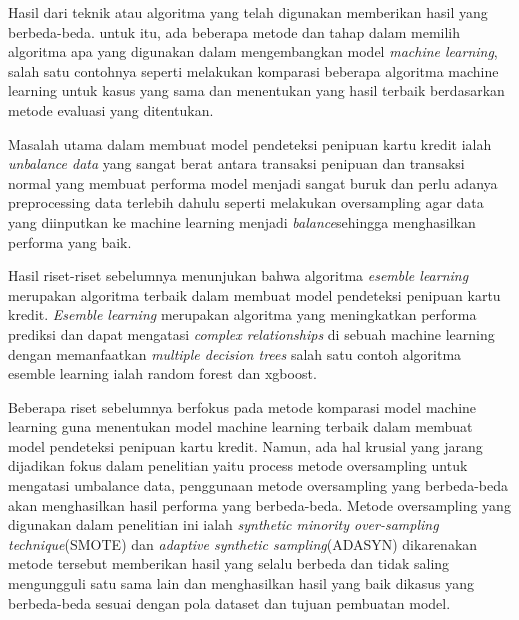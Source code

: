 Hasil dari teknik atau algoritma yang telah digunakan memberikan hasil yang berbeda-beda. untuk itu, ada beberapa metode dan tahap dalam memilih algoritma apa yang digunakan dalam mengembangkan model \textit{machine learning}, salah satu contohnya seperti melakukan komparasi beberapa algoritma machine learning untuk kasus yang sama dan menentukan yang hasil terbaik berdasarkan metode evaluasi yang ditentukan\cite{mniai2023novel}.

Masalah utama dalam membuat model pendeteksi penipuan kartu kredit ialah \textit{unbalance data} yang sangat berat antara transaksi penipuan dan transaksi normal yang membuat performa model menjadi sangat buruk dan perlu adanya preprocessing data terlebih dahulu seperti melakukan oversampling agar data yang diinputkan ke machine learning menjadi \textit{balance}sehingga menghasilkan performa yang baik\cite{mniai2023novel}.

Hasil riset-riset sebelumnya menunjukan bahwa algoritma \textit{esemble learning} merupakan algoritma terbaik dalam membuat model pendeteksi penipuan kartu kredit\cite{ningsih2022analisis}. \textit{Esemble learning} merupakan algoritma yang meningkatkan performa prediksi dan dapat mengatasi \textit{complex relationships} di sebuah machine learning dengan memanfaatkan \textit{multiple decision trees} salah satu contoh  algoritma esemble learning ialah random forest dan xgboost\cite{dietterich2002ensemble}.

Beberapa riset sebelumnya berfokus pada metode komparasi model machine learning guna menentukan model machine learning terbaik dalam membuat model pendeteksi penipuan kartu kredit\cite{mniai2023novel}. Namun, ada hal krusial yang jarang dijadikan fokus dalam penelitian yaitu process metode oversampling untuk mengatasi umbalance data, penggunaan metode oversampling yang berbeda-beda akan menghasilkan hasil performa yang berbeda-beda\cite{liu2004effect}. Metode oversampling yang digunakan dalam penelitian ini ialah \textit{synthetic minority over-sampling technique}(SMOTE)\cite{chawla2002smote} dan \textit{adaptive synthetic sampling}(ADASYN)\cite{4633969} dikarenakan metode tersebut memberikan hasil yang selalu berbeda dan tidak saling mengungguli satu sama lain dan menghasilkan hasil yang baik dikasus yang berbeda-beda sesuai dengan pola dataset dan tujuan pembuatan model\cite{brandt2021comparative}.

